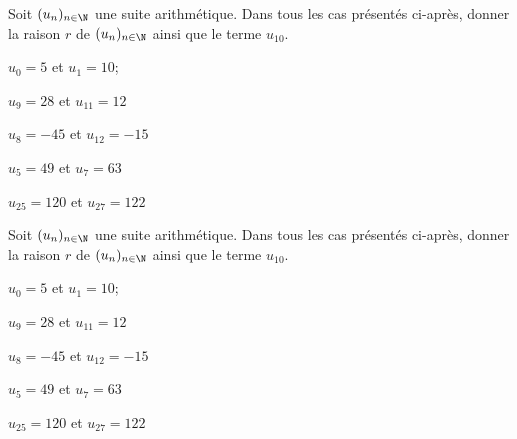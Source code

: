 \documentclass{exos}
\begin{document}
\begin{exercize*}
Soit $(u_n)_{n \in \N}$ une suite arithmétique. Dans tous les cas présentés ci-après, donner la raison $r$ de $(u_n)_{n \in \N}$ ainsi que le terme $u_10$.
\begin{alphaquestions}
\item $u_0 = 5$ et $u_1 = 10$;
\item $u_9 = 28$ et $u_{11} = 12$
\item $u_8 = -45$ et $u_{12} = -15$
\item $u_5 = 49$ et $u_7 = 63$
\item $u_{25} = 120$ et $u_{27}=122$
\end{alphaquestions} 
\end{exercize*}
\vspace*{3cm}
\begin{exercize*}
Soit $(u_n)_{n \in \N}$ une suite arithmétique. Dans tous les cas présentés ci-après, donner la raison $r$ de $(u_n)_{n \in \N}$ ainsi que le terme $u_10$.
\begin{alphaquestions}
\item $u_0 = 5$ et $u_1 = 10$;
\item $u_9 = 28$ et $u_{11} = 12$
\item $u_8 = -45$ et $u_{12} = -15$
\item $u_5 = 49$ et $u_7 = 63$
\item $u_{25} = 120$ et $u_{27}=122$
\end{alphaquestions} 
\end{exercize*}
\end{document}
